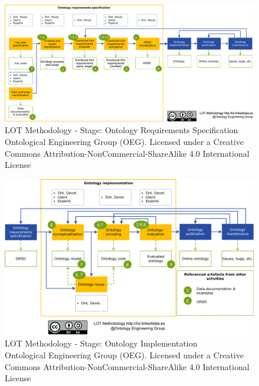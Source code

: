 \documentclass{guideline/sty/rapport}
\begin{document}
       \begin{figure}[H]
        \centering
          \includegraphics[width=1.1\textwidth]{images/LOTFigure3.pdf}
          \caption{LOT Methodology - Stage: Ontology Requirements Specification \\ Ontological Engineering Group (OEG). Licensed under a Creative Commons Attribution-NonCommercial-ShareAlike 4.0 International License}
    \label{fig:lotfigure3}
    \end{figure}
    
    \begin{figure}[H]
        \centering
          \includegraphics[width=1.1\textwidth]{images/LOTFigure4.pdf}
          \caption{LOT Methodology - Stage: Ontology Implementation \\ Ontological Engineering Group (OEG). Licensed under a Creative Commons Attribution-NonCommercial-ShareAlike 4.0 International License}
    \label{fig:lotfigure4}
    \end{figure}
    
\end{document}
